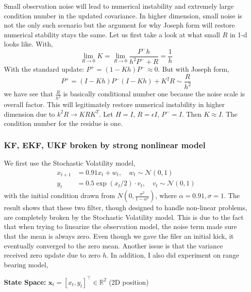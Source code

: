 \documentclass{article}
\begin{document}
Small observation noise will lead to numerical instability and extremely large condition number in the updated covariance. In higher dimension, small noise is not the only such scenario but the argument for why Joseph form will restore numerical stability stays the same. Let us first take a look at what small $R$ in 1-d looks like. With,
\begin{equation}
   \lim_{R\rightarrow 0} K =  \lim_{R\rightarrow 0} \frac{P^- h}{h^2 P^- + R} =  \frac{1}{h}
\end{equation}
With the standard update: $P^+ = (1 - K h) P^- \approx 0$. But with Joseph form, 
\begin{equation}
    P^+ = (I - K h) P^- (I - K h) + K^2 R \sim \frac{R}{h^2}
\end{equation}
we have see that $\frac{R}{h^2}$ is basically conditional number one because the noise scale is overall factor. This will legitimately restore numerical instability in higher dimension due to $k^2 R \rightarrow K R K^T$. Let $H = I$, $R = \epsilon I$, $P^- = I$. Then $K \approx I$. The condition number for the residue is one.




\subsubsection{KF, EKF, UKF broken by strong nonlinear model}
We first use the Stochastic Volatility model,
\begin{align}
x_{t+1} &= 0.91 x_t +  w_t, \quad w_t \sim \mathcal{N}(0, 1) \\
y_t &= 0.5 \exp(x_t/2) \cdot v_t, \quad v_t \sim \mathcal{N}(0, 1)
\end{align}
with the initial condition drawn from $N(0,\frac{\sigma^2}{1-\alpha^2})$, where $\alpha=0.91, \sigma=1$.  The result shows that these two filter, though designed to handle non-linear problems, are completely broken by the Stochastic Volatility model. This is due to the fact that when trying to linearize the observation model, the noise term made sure that the mean is always zero. Even though we gave the filer an initial kick, it eventually converged to the zero mean. Another issue is that the variance received zero update due to zero $h$. In addition, I also did experiment on range bearing model,


\textbf{State Space:} $\mathbf{x}_t = [x_t, y_t]^\top \in \mathbb{R}^2$ (2D position)
\end{document}
